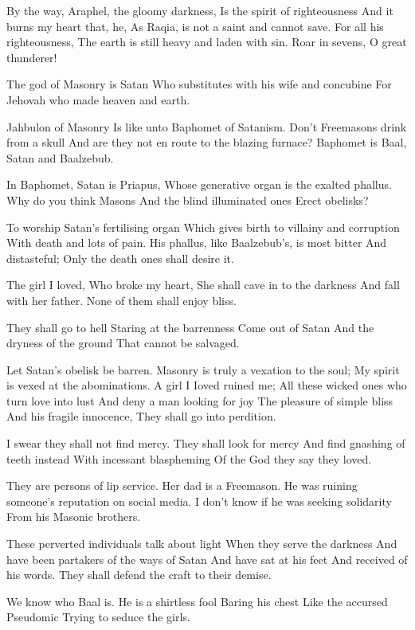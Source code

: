 \documentclass[
]{book}
\begin{document}
By the way, Araphel, the gloomy darkness,
Is the spirit of righteousness
And it burns my heart that, he,
As Raqia, is not a saint and cannot save.
For all his righteousness,
The earth is still heavy and laden with sin.
Roar in sevens, O great thunderer!

The god of Masonry is Satan
Who substitutes with his wife and concubine
For Jehovah who made heaven and earth.

Jahbulon of Masonry
Is like unto Baphomet of Satanism.
Don't Freemasons drink from a skull
And are they not en route to the blazing furnace?
Baphomet is Baal, Satan and Baalzebub.

In Baphomet, Satan is Priapus,
Whose generative organ is the exalted phallus.
Why do you think Masons
And the blind illuminated ones
Erect obelisks?

To worship Satan's fertilising organ
Which gives birth to villainy and corruption
With death and lots of pain.
His phallus, like Baalzebub's, is most bitter
And distasteful;
Only the death ones shall desire it.

The girl I loved,
Who broke my heart,
She shall cave in to the darkness
And fall with her father.
None of them shall enjoy bliss.

They shall go to hell
Staring at the barrenness
Come out of Satan
And the dryness of the ground
That cannot be salvaged.

Let Satan's obelisk be barren.
Masonry is truly a vexation to the soul;
My spirit is vexed at the abominations.
A girl I Ioved ruined me;
All these wicked ones who turn love into lust
And deny a man looking for joy
The pleasure of simple bliss
And his fragile innocence,
They shall go into perdition.

I swear they shall not find mercy.
They shall look for mercy
And find gnashing of teeth instead
With incessant blaspheming
Of the God they say they loved.

They are persons of lip service.
Her dad is a Freemason.
He was ruining someone's reputation on social media.
I don't know if he was seeking solidarity
From his Masonic brothers.

These perverted individuals talk about light
When they serve the darkness
And have been partakers of the ways of Satan
And have sat at his feet
And received of his words.
They shall defend the craft to their demise.

We know who Baal is.
He is a shirtless fool
Baring his chest
Like the accursed Pseudomic
Trying to seduce the girls.
\end{document}
